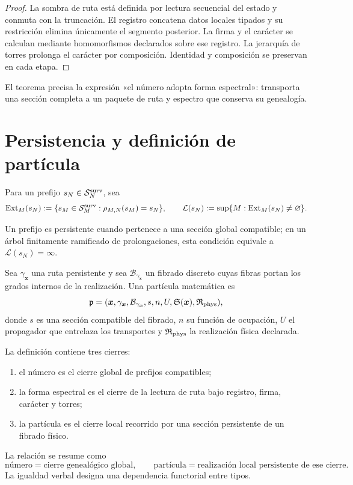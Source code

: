 \begin{proof}
La sombra de ruta está definida por lectura secuencial del estado y conmuta
con la truncación. El registro concatena datos locales tipados y su
restricción elimina únicamente el segmento posterior. La firma y el carácter
se calculan mediante homomorfismos declarados sobre ese registro. La
jerarquía de torres prolonga el carácter por composición. Identidad y
composición se preservan en cada etapa.
\end{proof}

El teorema precisa la expresión «el número adopta forma espectral»:
transporta una sección completa a un paquete de ruta y espectro que conserva
su genealogía.

\section{Persistencia y definición de partícula}

Para un prefijo \(s_N\in\mathcal S_N^{\rm surv}\), sea
\[
 \operatorname{Ext}_M(s_N)
 :=\{s_M\in\mathcal S_M^{\rm surv}:\rho_{M,N}(s_M)=s_N\},
 \qquad
 \mathcal L(s_N)
 :=\sup\{M:\operatorname{Ext}_M(s_N)\neq\varnothing\}.
\]

\begin{definition}[Persistencia]
\label{def:persistencia-bisagra-numero-particula}
Un prefijo es persistente cuando pertenece a una sección global compatible;
en un árbol finitamente ramificado de prolongaciones, esta condición equivale
a \(\mathcal L(s_N)=\infty\).
\end{definition}

\begin{definition}
\label{def:particula-matematica-bisagra}
Sea \(\gamma_{\boldsymbol x}\) una ruta persistente y sea
\(\mathcal B_{\gamma_{\boldsymbol x}}\) un fibrado discreto cuyas fibras
portan los grados internos de la realización. Una partícula matemática es
\[
 \mathfrak p=
 (\boldsymbol x,
  \gamma_{\boldsymbol x},
  \mathcal B_{\gamma_{\boldsymbol x}},
  s,n,U,
  \mathfrak S(\boldsymbol x),
  \mathfrak R_{\rm phys}),
\]
donde \(s\) es una sección compatible del fibrado, \(n\) su función de
ocupación, \(U\) el propagador que entrelaza los transportes y
\(\mathfrak R_{\rm phys}\) la realización física declarada.
\end{definition}

La definición contiene tres cierres:
\begin{enumerate}
\item el número es el cierre global de prefijos compatibles;
\item la forma espectral es el cierre de la lectura de ruta bajo registro,
      firma, carácter y torres;
\item la partícula es el cierre local recorrido por una sección persistente
      de un fibrado físico.
\end{enumerate}
La relación se resume como
\[
 \boxed{
 \text{número}=\text{cierre genealógico global},
 \qquad
 \text{partícula}=\text{realización local persistente de ese cierre}.}
\]
La igualdad verbal designa una dependencia functorial entre tipos.

